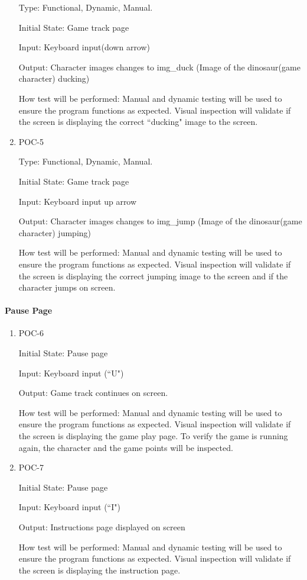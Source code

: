 \documentclass[12pt, titlepage]{article}
\begin{document}
\begin{enumerate}
		Type: Functional, Dynamic, Manual.
		
		Initial State: Game track page
		
		Input: Keyboard input(down arrow) 
		
		Output: Character images changes to img\_duck (Image of the dinosaur(game character) ducking)
		
		How test will be performed: Manual and dynamic testing will be used to ensure the program functions as expected. Visual inspection will validate if the screen is displaying the correct ``ducking" image to the screen.
		
		\item{POC-5\\}
		
		Type: Functional, Dynamic, Manual.
		
		Initial State: Game track page
		
		Input: Keyboard input up arrow
		
		Output: Character images changes to img\_jump (Image of the dinosaur(game character) jumping)
		
		How test will be performed: Manual and dynamic testing will be used to ensure the program functions as expected. Visual inspection will validate if the screen is displaying the correct jumping image to the screen and if the character jumps on screen.
		
		
		
	\end{enumerate}
	
	\paragraph{Pause Page}
	\begin{enumerate}
		\item{POC-6\\}
		
		Initial State: Pause page
		
		Input: Keyboard input (``U")
		
		Output: Game track continues on screen. 
		
		How test will be performed: Manual and dynamic testing will be used to ensure the program functions as expected. Visual inspection will validate if the screen is displaying the game play page. To verify the game is running again, the character and the game points will be inspected.  
		
		\item{POC-7\\}
		
		Initial State: Pause page
		
		Input: Keyboard input (``I")
		
		Output: Instructions page displayed on screen 
		
		How test will be performed: Manual and dynamic testing will be used to ensure the program functions as expected. Visual inspection will validate if the screen is displaying the instruction page.
	\end{enumerate}
	
\end{document}
